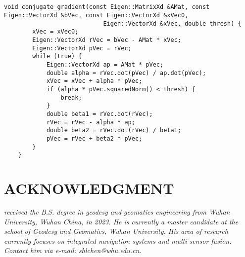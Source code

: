\documentclass[12pt, onecolumn]{article}
\newcommand\normf{\fangsong}
\begin{document}
	\subsection{\normf{关键代码}}
	\begin{lstlisting}[caption=\normf{共轭梯度下降法}]
    void conjugate_gradient(const Eigen::MatrixXd &AMat, const Eigen::VectorXd &bVec, const Eigen::VectorXd &xVec0,
                            Eigen::VectorXd &xVec, double thresh) {
        xVec = xVec0;
        Eigen::VectorXd rVec = bVec - AMat * xVec;
        Eigen::VectorXd pVec = rVec;
        while (true) {
            Eigen::VectorXd ap = AMat * pVec;
            double alpha = rVec.dot(pVec) / ap.dot(pVec);
            xVec = xVec + alpha * pVec;
            if (alpha * pVec.squaredNorm() < thresh) {
                break;
            }
            double beta1 = rVec.dot(rVec);
            rVec = rVec - alpha * ap;
            double beta2 = rVec.dot(rVec) / beta1;
            pVec = rVec + beta2 * pVec;
        }
    }
	\end{lstlisting}
		
	\newpage
	\section{ACKNOWLEDGMENT}
	\begin{tcolorbox}[colback=white,colframe=white!70!black,title={\bfseries Author Information}]
	\par\noindent
		\parbox[t]{\linewidth}{
	 \noindent{}
	 \emph{
	 received the B.S. degree in geodesy and geomatics engineering from Wuhan University, Wuhan China, in 2023.
	 He is currently a master candidate at the school of Geodesy and Geomatics, Wuhan University. His area of research currently focuses on integrated navigation systems and multi-sensor fusion.
	 Contact him via e-mail: shlchen@whu.edu.cn.
	 }}
	\end{tcolorbox}
		
		
\end{document}
